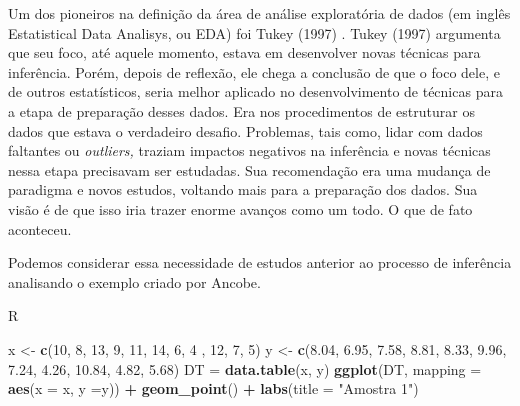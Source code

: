 \documentclass[
]{book}
\newenvironment{Shaded}{\begin{snugshade}}{\end{snugshade}}
\newcommand{\AttributeTok}[1]{\textcolor[rgb]{0.13,0.29,0.53}{#1}}
\newcommand{\DecValTok}[1]{\textcolor[rgb]{0.00,0.00,0.81}{#1}}
\newcommand{\FloatTok}[1]{\textcolor[rgb]{0.00,0.00,0.81}{#1}}
\newcommand{\FunctionTok}[1]{\textcolor[rgb]{0.13,0.29,0.53}{\textbf{#1}}}
\newcommand{\NormalTok}[1]{#1}
\newcommand{\OtherTok}[1]{\textcolor[rgb]{0.56,0.35,0.01}{#1}}
\newcommand{\SpecialCharTok}[1]{\textcolor[rgb]{0.81,0.36,0.00}{\textbf{#1}}}
\newcommand{\StringTok}[1]{\textcolor[rgb]{0.31,0.60,0.02}{#1}}
\begin{document}
Um dos pioneiros na definição da área de análise exploratória de dados (em inglês Estatistical Data Analisys, ou EDA) foi Tukey (1997) \citep{tukey1977exploratory}. Tukey (1997) argumenta que seu foco, até aquele momento, estava em desenvolver novas técnicas para inferência. Porém, depois de reflexão, ele chega a conclusão de que o foco dele, e de outros estatísticos, seria melhor aplicado no desenvolvimento de técnicas para a etapa de preparação desses dados. Era nos procedimentos de estruturar os dados que estava o verdadeiro desafio. Problemas, tais como, lidar com dados faltantes ou \emph{outliers,} traziam impactos negativos na inferência e novas técnicas nessa etapa precisavam ser estudadas. Sua recomendação era uma mudança de paradigma e novos estudos, voltando mais para a preparação dos dados. Sua visão é de que isso iria trazer enorme avanços como um todo. O que de fato aconteceu.

Podemos considerar essa necessidade de estudos anterior ao processo de inferência analisando o exemplo criado por Ancobe.

R

\begin{Shaded}
\begin{Highlighting}[]
\NormalTok{x }\OtherTok{\textless{}{-}} \FunctionTok{c}\NormalTok{(}\DecValTok{10}\NormalTok{, }\DecValTok{8}\NormalTok{, }\DecValTok{13}\NormalTok{, }\DecValTok{9}\NormalTok{, }\DecValTok{11}\NormalTok{, }\DecValTok{14}\NormalTok{, }\DecValTok{6}\NormalTok{, }\DecValTok{4}\NormalTok{ , }\DecValTok{12}\NormalTok{, }\DecValTok{7}\NormalTok{, }\DecValTok{5}\NormalTok{)}
\NormalTok{y }\OtherTok{\textless{}{-}} \FunctionTok{c}\NormalTok{(}\FloatTok{8.04}\NormalTok{, }\FloatTok{6.95}\NormalTok{, }\FloatTok{7.58}\NormalTok{, }\FloatTok{8.81}\NormalTok{, }\FloatTok{8.33}\NormalTok{, }\FloatTok{9.96}\NormalTok{, }\FloatTok{7.24}\NormalTok{, }\FloatTok{4.26}\NormalTok{, }\FloatTok{10.84}\NormalTok{, }\FloatTok{4.82}\NormalTok{, }\FloatTok{5.68}\NormalTok{)}
\NormalTok{DT }\OtherTok{=} \FunctionTok{data.table}\NormalTok{(x, y)}
\FunctionTok{ggplot}\NormalTok{(DT, }\AttributeTok{mapping =} \FunctionTok{aes}\NormalTok{(}\AttributeTok{x =}\NormalTok{ x, }\AttributeTok{y =}\NormalTok{y)) }\SpecialCharTok{+}
  \FunctionTok{geom\_point}\NormalTok{() }\SpecialCharTok{+}
  \FunctionTok{labs}\NormalTok{(}\AttributeTok{title =} \StringTok{"Amostra 1"}\NormalTok{)}
\end{Highlighting}
\end{Shaded}
\end{document}
